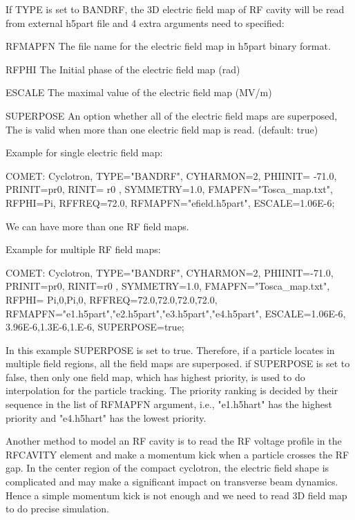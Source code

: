 If TYPE is set to BANDRF, the 3D electric field map of RF cavity will be read from external h5part file and 4 extra arguments need to specified:
\begin{kdescription}
\item[RFMAPFN]
The file name for the electric field map in h5part binary format.
\item[RFPHI]
  The Initial phase of the electric field map (rad)
\item[ESCALE]
   The maximal value of the electric field map (MV/m)
\item[SUPERPOSE]
An option whether all of the electric field maps are superposed, The is  valid when more than one electric field map is read. (default: true)
\end{kdescription}
\noindent Example for single electric field map:
\begin{example}
COMET: Cyclotron, TYPE="BANDRF", CYHARMON=2, PHIINIT= -71.0,
PRINIT=pr0, RINIT= r0 , SYMMETRY=1.0, FMAPFN="Tosca_map.txt",
RFPHI=Pi, RFFREQ=72.0,  RFMAPFN="efield.h5part",
ESCALE=1.06E-6;
\end{example}
We can have more than one RF field maps.

\noindent Example for multiple RF field maps:
\begin{example}
COMET: Cyclotron, TYPE="BANDRF", CYHARMON=2, PHIINIT=-71.0,
PRINIT=pr0, RINIT=r0 , SYMMETRY=1.0, FMAPFN="Tosca_map.txt",
RFPHI= {Pi,0,Pi,0}, RFFREQ={72.0,72.0,72.0,72.0},
RFMAPFN={"e1.h5part","e2.h5part","e3.h5part","e4.h5part"},
ESCALE={1.06E-6, 3.96E-6,1.3E-6,1.E-6}, SUPERPOSE=true;
\end{example}
In this example SUPERPOSE is set to true. Therefore, if a particle locates in multiple field regions,  all the field maps are superposed.
if SUPERPOSE is set to  false, then only one field map, which has highest priority,  is used to do interpolation for the particle tracking.
The priority ranking is decided by their sequence in the list of RFMAPFN argument, i.e., "e1.h5hart" has the highest priority and "e4.h5hart" has the lowest priority.

Another method to model an RF cavity is to read the RF voltage profile in the
RFCAVITY element  and make a momentum kick when a
particle crosses the RF gap. In the center region of the compact cyclotron, the
electric field shape is complicated and may make a significant impact on
transverse beam dynamics. Hence a simple momentum kick is not enough and we need
to read 3D field map to do precise simulation.

